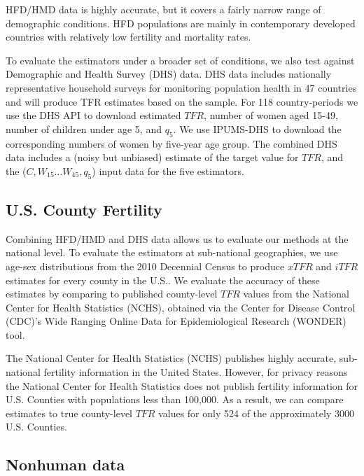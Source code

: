 \documentclass[12pt]{article}
\begin{document}
HFD/HMD data is highly accurate, but it covers a fairly narrow range of
demographic conditions. HFD populations are mainly in contemporary
developed countries with relatively low fertility and mortality rates.

To evaluate the estimators under a broader set of conditions, we also
test against Demographic and Health Survey (DHS) data. DHS data includes
nationally representative household surveys for monitoring population
health in 47 countries and will produce TFR estimates based on the
sample. For 118 country-periods we use the DHS API \citep{DHSAPIcite} to
download estimated \(TFR\), number of women aged 15-49, number of
children under age 5, and \(q_5\). We use IPUMS-DHS \citep{IPUMSDHS} to
download the corresponding numbers of women by five-year age group. The
combined DHS data includes a (noisy but unbiased) estimate of the target
value for \(TFR\), and the (\(C, W_{15}\ldots W_{45}, q_5\)) input data
for the five estimators.

\hypertarget{u.s.-county-fertility}{%
\subsection{U.S. County Fertility}\label{u.s.-county-fertility}}

Combining HFD/HMD and DHS data allows us to evaluate our methods at the
national level. To evaluate the estimators at sub-national geographies,
we use age-sex distributions from the 2010 Decennial Census to produce
\(xTFR\) and \(iTFR\) estimates for every county in the U.S.. We
evaluate the accuracy of these estimates by comparing to published
county-level \(TFR\) values from the National Center for Health
Statistics (NCHS), obtained via the Center for Disease Control (CDC)'s
Wide Ranging Online Data for Epidemiological Research (WONDER) tool.

The National Center for Health Statistics (NCHS) publishes highly
accurate, sub-national fertility information in the United States.
However, for privacy reasons the National Center for Health Statistics
does not publish fertility information for U.S. Counties with
populations less than 100,000. As a result, we can compare estimates to
true county-level \(TFR\) values for only 524 of the approximately 3000
U.S. Counties.

\hypertarget{nonhuman-data}{%
\subsection{Nonhuman data}\label{nonhuman-data}}
\end{document}
